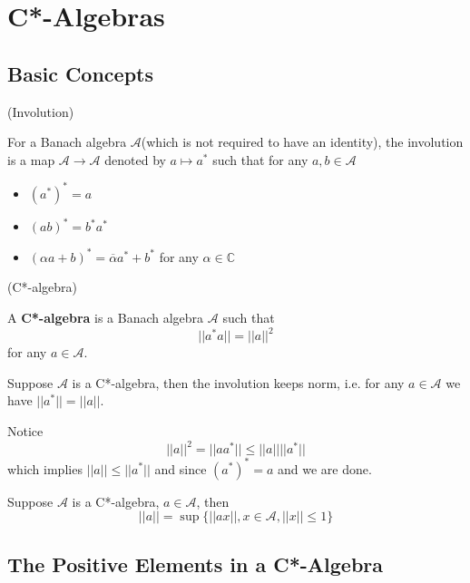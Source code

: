 \section{C*-Algebras}

\subsection{Basic Concepts}

\begin{definition}(Involution)\par
    For a Banach algebra $\mathcal{A}$(which is not required to have an identity), the involution is a map $\mathcal{A} \to \mathcal{A}$ denoted by $a\mapsto a^*$ such that for any $a,b\in\mathcal{A}$
    \begin{itemize}
        \item $(a^*)^* = a$
        \item $(ab)^* = b^*a^*$
        \item $(\alpha a + b)^* = \overline{\alpha}a^*+b^*$ for any $\alpha \in \mathbb{C}$
    \end{itemize}
\end{definition}

\begin{definition}(C*-algebra)\par
    A \textbf{C*-algebra} is a Banach algebra $\mathcal{A}$ such that
    \[||a^*a|| = ||a||^2\]
    for any $a\in\mathcal{A}$.    
\end{definition}

\begin{proposition}
    Suppose $\mathcal{A}$ is a C*-algebra, then the involution keeps norm, i.e. for any $a\in \mathcal{A}$ we have $||a^*|| = ||a||$.
\end{proposition}
\Pf\par
    Notice
    \[
    ||a||^2 = ||aa^*|| \leq ||a||||a^*||
    \]
    which implies $||a|| \leq ||a^*||$ and since $(a^*)^* = a$ and we are done.

\begin{proposition}
    Suppose $\mathcal{A}$ is a C*-algebra, $a\in\mathcal{A}$, then
    \[
    ||a|| = \sup\{||ax||, x\in\mathcal{A}, ||x|| \leq 1\}
    \]
\end{proposition}
\Pf\par
    

\subsection{The Positive Elements in a C*-Algebra}

